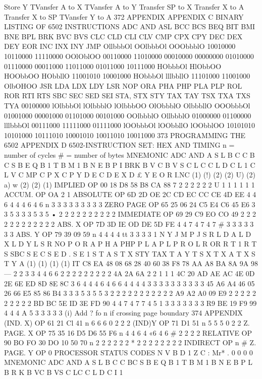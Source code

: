 \documentclass{book}
\begin{document}
{{{{{{{{{{{{{{{{{{{{{{{{{{{{{{{{{{{{{{{{{{{{{{{{{{{{{{{{{{{{{{{{{{{{{{{{{{{{{{{{{{{{{{{{{{{{{{{{{{{{{{{{{{{{{{{{{{{{{{{{{{{{{{{{{{{{{{{{{{{{Store Y
TVansfer A to X
TVansfer A to Y
Transfer SP to X
Transfer X to A
Transfer X to SP
TVansfer Y to A
372
APPENDIX
APPENDIX C
BINARY LISTING OF 6502 INSTRUCTIONS
ADC
AND
ASL
BCC
BCS
BEQ
BIT
BMI
BNE
BPL
BRK
BVC
BVS
CLC
CLD
CLI
CLV
CMP
CPX
CPY
DEC
DEX
DEY
EOR
INC
INX
INY
JMP
OllbbbOl
OOlbbbOl
OOObbblO
10010000
10110000
11110000
OOlOblOO
00110000
11010000
00010000
00000000
01010000
01110000
00011000
11011000
01011000
10111000
HObbbOl
HlObbOO
HOObbOO
HObbllO
11001010
10001000
HObbbOl
lllbbllO
11101000
11001000
OlbOHOO
JSR
LDA
LDX
LDY
LSR
NOP
ORA
PHA
PHP
PLA
PLP
ROL
ROR
RTI
RTS
SBC
SEC
SED
SEI
STA,
STX
STY
TAX
TAY
TSX
TXA
TXS
TYA
00100000
lOlbbbOl
lOlbbblO
lOlbbbOO
OlObbblO
OlbbbllO
OOObbbOl
01001000
00001000
01101000
00101000
OOlbbblO
OllbbblO
01000000
01100000
lllbbbOl
00111000
11111000
01111000
lOObbbOl
lOObbllO
lOObblOO
10101010
10101000
10111010
10001010
10011010
10011000
373
PROGRAMMING THE 6502
APPENDIX D
6502-INSTRUCTION SET: HEX AND TIMING
n = number of cycles # = number of bytes
MNEMONIC
ADC
AND
A S L
B C C
B C S
B E Q
B 1 T
B M 1
B N E
B P I
BRK
B V C
B V S
C L C
C L D
C L 1
C L V
C MP
C P X
C P Y
D E C
D E X
D £ Y
E O R
I.NC
(1)
(!)
(2)
(2)
U)
(2)
a)
w
(2)
(2)
(1)
IMPLIED
OP
00
18
D8
58
B8
CA
88
7
2
2
2
2
2
2
U
1
1
1
1
1
1
ACCUM.
OP
OA 2 1
ABSOLUTE
OP
6D
2D
OE
2C
CD
EC
CC
CE
4D
EE
4
4
6
4
4
4
6
4
6
n
3
3
3
3
3
3
3
3
3
ZERO PAGE
OP
65
25
06
24
C5
E4
C6
45
E6
3
3
5
3
3
3
5
3
5
•
2
2
2
2
2
2
2
2
2
2
IMMEDIATE
OP
69
29
C9
EO
CO
49
2
2
2
2
2
2
2
2
2
2
2
2
ABS. X
OP
7D
3D
IE
OD
DE
5D
FE
4
4
7
4
7
4
7
#
3
3
3
3
3
3
3
ABS. Y
OP
79
39
09
59
n
4
4
4
4
tt
3
3
3
3
1 N Y
J M P
J S R
L D A
L D X
L D Y
L S R
NO P
O R A
P H A
PHP
P L A
P L P
R O L
R OR
R T 1
R T S
SBC
S E C
S E D
. S E 1
S T A
S T X
STY
TAX
T A Y
T S X
T X A
T X S
T Y A
(1)
(1)
(1)
(1)
IT
C8
EA
48
08
68
28
40
60
38
F8
78
AA
A8
BA
8A
9A
98
—
2
2
3
3
4
4
6
6
2
2
2
2
2
2
2
2
2
4A
2A
6A
2
2
1
1
1
4C
20
AD
AE
AC
4E
0D
2E
6E
ED
8D
8E
8C
3
6
4
4
4
6
4
6
6
4
4
4
4
3
3
3
3
3
3
3
3
3
3
45
A6
A4
46
05
26
66
E5
85
86
B4
3
3
3
5
3
5
5
3
2
2
2
2
2
2
2
2
2
2
2
A9
A2
A0
09
E9
2
2
2
2
2
2
2
2
2
2
BD
BC
5E
ID
3E
FD
90
4
4
7
4
7
7
4
5
1
3
3
3
3
3
3
3
R9
BE
19
F9
99
4
4
4
A
5
3
3
3
3
3
(i) Add ? fo n if crossing page boundary
374
APPENDIX
(IND. X)
OP
61
21
Cl
41
n
6
6
6
0
2
2
2
(IND)Y
OP
71
D1
51
n
5
5
5
0
2
2
Z. PAGE. X
OP
75
35
16
D5
D6
55
F6
n
4
4
6
4
«6
4
6
#
2
2
2
2
RELATIVE
OP
90
BO
FO
30
DO
10
50
70
n
2
2
2
2
2
2
*
2
2
2
2
2
2
2
2
INDIRECT
OP n #
Z. PAGE. Y
OP 0
PROCESSOR
STATUS CODES
N V B D 1 Z C
:
Mr* .
0
0
0
0
MNEMONIC
ADC
AND
A S L
B C C
BC S
B E Q
B 1 T
B M 1
B N E
B P L
B R K
B VC
B VS
C LC
C L D
C I 1
}}}}}}}}}}}}}}}}}}}}}}}}}}}}}}}}}}}}}}}}}}}}}}}}}}}}}}}}}}}}}}}}}}}}}}}}}}}}}}}}}}}}}}}}}}}}}}}}}}}}}}}}}}}}}}}}}}}}}}}}}}}}}}}}}}}}}}}}}}}}
\end{document}
